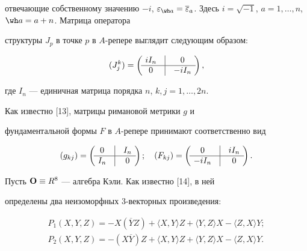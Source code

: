 отвечающие собственному значению $-i$, $\ep_{\wh a}=\overline


\ep_a$. Здесь $i=\sqrt{-1}$, $a=1,\dotsc,n$, $\wh a= a+n$. Матрица оператора


структуры $J_p$ в точке $p$ в $A$-репере выглядит следующим образом:


$$


(J^k_j)=\left(\ \begin{matrix} iI_n & \vline & 0 \\


\hline


0 & \vline & -iI_n \end{matrix}\ \right),


$$


где $I_n$ --- единичная матрица порядка $n$, $k,j=1,\dotsc,2n$. 


Как известно [13], матрицы римановой метрики $g$ и 


фундаментальной формы $F$ в $A$-репере принимают соответственно вид


$$


(g_{kj})=\left(\ \begin{matrix}  0& \vline & I_n \\


\hline I_n & \vline & 0 \end{matrix}\ \right);\quad


(F_{kj})=\left(\ \begin{matrix}  0& \vline & iI_n \\


\hline -iI_n & \vline & 0 \end{matrix}\ \right).


$$





Пусть $\bold O\equiv R^8$ --- алгебра Кэли. Как известно [14], в ней 


определены два неизоморфных 3-векторных произведения:


\begin{gather*}


P_1(X,Y,Z)=-X(\overline YZ) + \langle X,Y \rangle Z + \langle Y,Z \rangle X -


\langle Z,X \rangle Y; \\


P_2(X,Y,Z)=-(X\overline Y)Z + \langle X,Y \rangle Z + \langle Y,Z \rangle X -


\langle Z,X \rangle Y.


\end{gather*}


